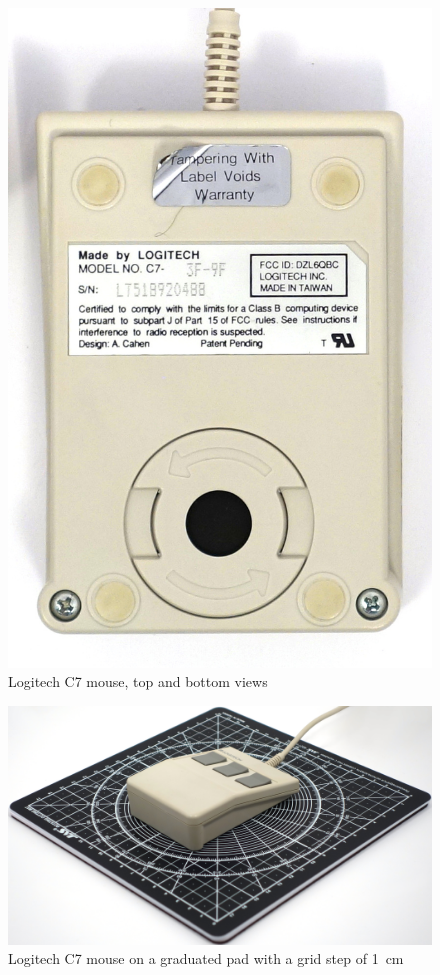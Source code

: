 \documentclass[11pt, a4paper]{article}
\begin{document}
\begin{figure}[h]
    \includegraphics[scale=0.45]{1985_logitech_c7_mouse/bottom_30.jpg}
    \caption{Logitech C7 mouse, top and bottom views}
    \label{fig:LogitechC7TopAndBottom}
\end{figure}

\begin{figure}[h]
    \centering
    \includegraphics[scale=0.35]{1985_logitech_c7_mouse/size_30.jpg}
    \caption{Logitech C7 mouse on a graduated pad with a grid step of 1~cm}
    \label{fig:LogitechC7Size}
\end{figure}
\end{document}
